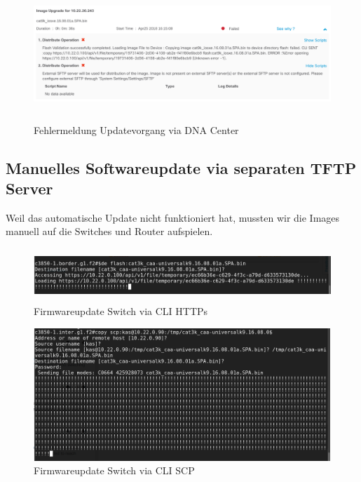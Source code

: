 \begin{figure}[H]
	\centering
	\includegraphics[height=5cm]{img/updates/Selection_071.png}
	\caption{Fehlermeldung Updatevorgang via DNA Center}
	\label{fig:dna-center-provision-updates-1}
\end{figure}

\subsection{Manuelles Softwareupdate via separaten TFTP Server}
Weil das automatische Update nicht funktioniert hat, mussten wir die Images manuell auf die Switches und Router aufspielen.

\begin{figure}[H]
	\centering
	\includegraphics[height=2cm]{img/updates/Selection_082.png}
	\caption{Firmwareupdate Switch via CLI HTTPs}
	\label{fig:dna-center-provision-updates-2}
\end{figure}

\begin{figure}[H]
	\centering
	\includegraphics[height=5cm]{img/updates/Selection_108.png}
	\caption{Firmwareupdate Switch via CLI SCP}
	\label{fig:dna-center-provision-updates-3}
\end{figure}

